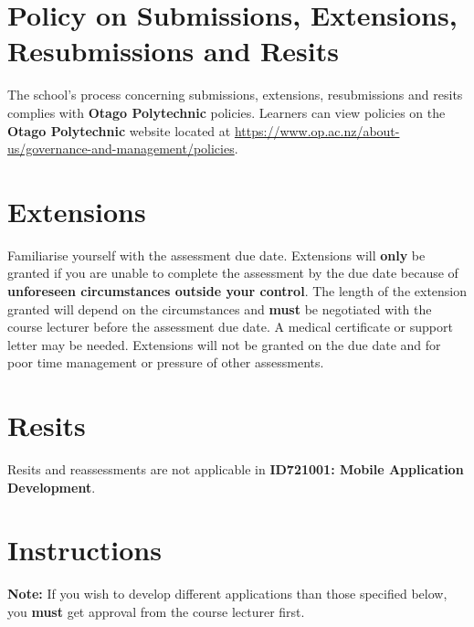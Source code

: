 \documentclass{article}
\begin{document}
\section*{Policy on Submissions, Extensions, Resubmissions and Resits}
The school's process concerning submissions, extensions, resubmissions and resits complies with \textbf{Otago Polytechnic} policies. Learners can view policies on the \textbf{Otago Polytechnic} website located at \href{https://www.op.ac.nz/about-us/governance-and-management/policies}{https://www.op.ac.nz/about-us/governance-and-management/policies}. 

\section*{Extensions}
Familiarise yourself with the assessment due date. Extensions will \textbf{only} be granted if you are unable to complete the assessment by the due date because of \textbf{unforeseen circumstances outside your control}. The length of the extension granted will depend on the circumstances and \textbf{must} be negotiated with the course lecturer before the assessment due date. A medical certificate or support letter may be needed. Extensions will not be granted on the due date and for poor time management or pressure of other assessments.

\section*{Resits}
Resits and reassessments are not applicable in \textbf{ID721001: Mobile Application Development}.

\newpage

\section*{Instructions}

\textbf{Note:} If you wish to develop different applications than those specified below, you \textbf{must} get approval from the course lecturer first.
\end{document}
